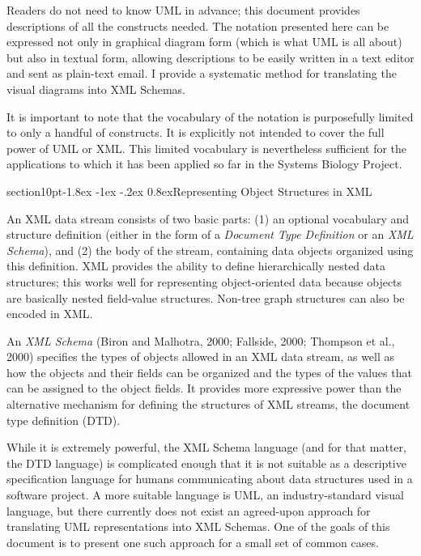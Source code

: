 \documentclass[10pt]{article}
\makeatletter
\renewcommand{\section}{\@startsection%
  {section}{1}{0pt}{-1.8ex \@plus -1ex \@minus -.2ex}%
  {0.8ex}{\normalfont\Large\bfseries}}
\makeatother
\begin{document}
Readers do not need to know UML in advance; this document provides
descriptions of all the constructs needed.  The notation presented here can
be expressed not only in graphical diagram form (which is what UML is all
about) but also in textual form, allowing descriptions to be easily written
in a text editor and sent as plain-text email.  I provide a systematic
method for translating the visual diagrams into XML Schemas.

It is important to note that the vocabulary of the notation is purposefully
limited to only a handful of constructs.  It is explicitly not intended to
cover the full power of UML or XML.  This limited vocabulary is
nevertheless sufficient for the applications to which it has been applied
so far in the Systems Biology Project.


\section{Representing Object Structures in XML}
\label{sec:representing}

An XML data stream consists of two basic parts: (1) an optional vocabulary
and structure definition (either in the form of a \emph{Document Type
  Definition} or an \emph{XML Schema}), and (2) the body of the stream,
containing data objects organized using this definition.  XML provides the
ability to define hierarchically nested data structures; this works well
for representing object-oriented data because objects are basically nested
field-value structures.  Non-tree graph structures can also be encoded in XML.

An \emph{XML Schema} (Biron and Malhotra, 2000; Fallside, 2000; Thompson et
al., 2000) specifies the types of objects allowed in an XML data stream, as
well as how the objects and their fields can be organized and the types of
the values that can be assigned to the object fields.  It provides more
expressive power than the alternative mechanism for defining the structures
of XML streams, the document type definition (DTD).

While it is extremely powerful, the XML Schema language (and for that
matter, the DTD language) is complicated enough that it is not suitable as
a descriptive specification language for humans communicating about data
structures used in a software project.  A more suitable language is UML, an
industry-standard visual language, but there currently does not exist an
agreed-upon approach for translating UML representations into XML Schemas.
One of the goals of this document is to present one such approach for a
small set of common cases.
\end{document}
